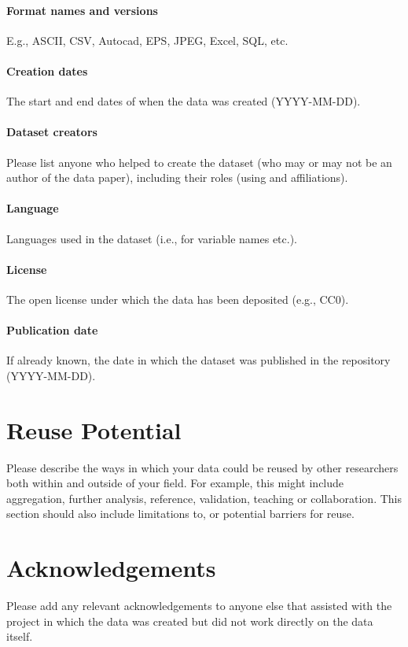 \documentclass{article}
\begin{document}
\paragraph{Format names and versions} E.g., ASCII, CSV, Autocad, EPS, JPEG, Excel, SQL, etc.
\paragraph{Creation dates} The start and end dates of when the data was created (YYYY-MM-DD).
\paragraph{Dataset creators} Please list anyone who helped to create the dataset (who may or may not be an author of the data paper), including their roles (using and affiliations).
\paragraph{Language} Languages used in the dataset (i.e., for variable names etc.).
\paragraph{License} The open license under which the data has been deposited (e.g., CC0). 
\paragraph{Publication date} If already known, the date in which the dataset was published in the repository (YYYY-MM-DD).

\section{Reuse Potential}
Please describe the ways in which your data could be reused by other researchers both within and outside of your field. For example, this might include aggregation, further analysis, reference, validation, teaching or collaboration. This section should also include limitations to, or potential barriers for reuse.

\section*{Acknowledgements}
Please add any relevant acknowledgements to anyone else that assisted with the project in which the data was created but did not work directly on the data itself.
\end{document}
